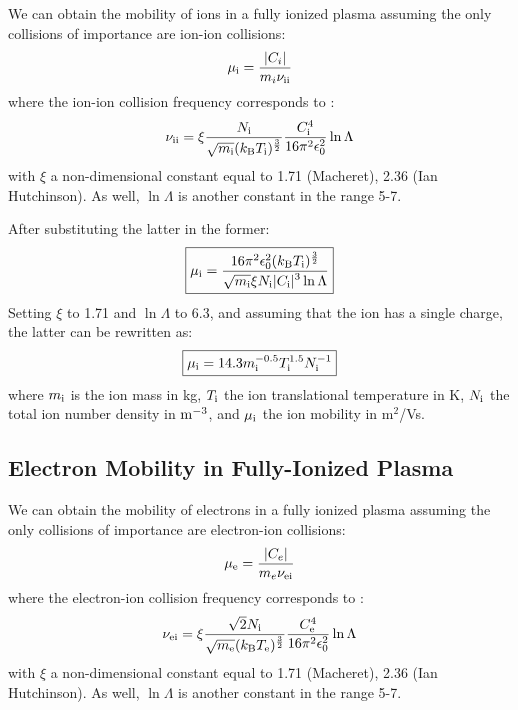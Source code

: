 \documentclass{warpdoc}
\newcommand{\mfd}{\displaystyle}
\newcommand\frameeqn[1]{\fbox{$\displaystyle #1$}}
\begin{document}
We can obtain the mobility of ions in a fully ionized plasma assuming the only collisions of importance are ion-ion collisions:
%
\begin{equation}
 \mu_{\rm i} = \frac{|C_i|}{m_i \nu_{\rm ii}}
\end{equation}
% 
where the ion-ion collision frequency corresponds to \cite{book:1984:chen}:
%
\begin{equation}
\nu_{\rm ii}=\xi \frac{ N_{\rm i}}{ \sqrt{m_{\rm i}} (k_{\rm B} T_{\rm i})^\frac{3}{2}}  \frac{C_{\rm i}^4}{16 \pi^2 \epsilon_0^2}  \ln \Lambda
\end{equation}
%
with $\xi$ a non-dimensional constant equal to 1.71 (Macheret), 2.36 (Ian Hutchinson). As well, $\ln \Lambda$ is another constant in the range 5-7.


After substituting the latter in the former:
%
\begin{equation}
\frameeqn{
 \mu_{\rm i} = \frac{16 \pi^2 \epsilon_0^2 (k_{\rm B} T_{\rm i})^\frac{3}{2}}{\mfd \sqrt{m_{\rm i}} \xi  N_{\rm i}  |C_{\rm i}|^3  \ln \Lambda}
}
\end{equation}
% 
Setting $\xi$ to 1.71 and $\ln \Lambda$ to 6.3, and assuming that the ion has a single charge, the latter can be rewritten as:
%
\begin{equation}
\frameeqn{
 \mu_{\rm i} = 14.3 m_{\rm i}^{-0.5} T_{\rm i}^{1.5} N_{\rm i}^{-1}
}
\end{equation}
% 
where $m_{\rm i}$ is the ion mass in kg, $T_{\rm i}$ the ion translational temperature in K, $N_{\rm i}$ the total ion number density in $\rm m^{-3}$, and $\mu_{\rm i}$ the ion mobility in m$^2$/Vs.


\subsection{Electron Mobility in Fully-Ionized Plasma}

We can obtain the mobility of electrons in a fully ionized plasma assuming the only collisions of importance are electron-ion collisions:
%
\begin{equation}
 \mu_{\rm e} = \frac{|C_e|}{m_e \nu_{\rm ei}}
\end{equation}
% 
where the electron-ion collision frequency corresponds to \cite{book:1984:chen}:
%
\begin{equation}
\nu_{\rm ei}=\xi \frac{ \sqrt{2} N_{\rm i}}{ \sqrt{m_{\rm e}} (k_{\rm B} T_{\rm e})^\frac{3}{2}}  \frac{C_{\rm e}^4}{16 \pi^2 \epsilon_0^2}  \ln \Lambda
\end{equation}
%
with $\xi$ a non-dimensional constant equal to 1.71 (Macheret), 2.36 (Ian Hutchinson). As well, $\ln \Lambda$ is another constant in the range 5-7.
\end{document}
